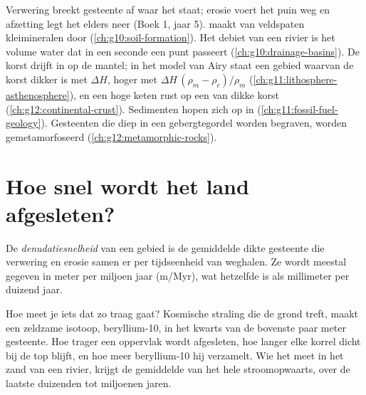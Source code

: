 \begin{recall}
Verwering breekt gesteente af waar het staat; erosie voert het puin weg
en afzetting legt het elders neer (Boek 1, jaar 5). 
maakt van veldspaten kleimineralen door 
(\cref{ch:g10:soil-formation}). Het debiet van een rivier is het volume
water dat in een seconde een punt passeert (\cref{ch:g10:drainage-basins}). De
korst drijft in  op de mantel; in het model van Airy staat een gebied waarvan de korst
dikker is met $\Delta H$, hoger met $\Delta H\,(\rho_m - \rho_c)/\rho_m$
(\cref{ch:g11:lithosphere-asthenosphere}), en een hoge keten rust op een 
van dikke korst (\cref{ch:g12:continental-crust}). Sedimenten hopen zich op in
 (\cref{ch:g11:fossil-fuel-geology}). Gesteenten die diep in
een gebergtegordel worden begraven, worden gemetamorfoseerd (\cref{ch:g12:metamorphic-rocks}).
\end{recall}

\section{Hoe snel wordt het land afgesleten?}

\begin{definition}[Denudatiesnelheid]\label{def:g12:destruction-of-mountains:denudation}
De \emph{denudatiesnelheid} van een gebied is de gemiddelde
dikte gesteente die verwering en erosie samen er per
tijdseenheid van weghalen. Ze wordt meestal gegeven in meter per miljoen jaar
(\unit{m/Myr}), wat hetzelfde is als millimeter per duizend jaar.
\end{definition}

Hoe meet je iets dat zo traag gaat? Kosmische straling die de grond treft, maakt
een zeldzame isotoop, beryllium-10, in het kwarts van de bovenste paar meter gesteente.
Hoe trager een oppervlak wordt afgesleten, hoe langer elke korrel dicht bij de top blijft,
en hoe meer beryllium-10 hij verzamelt. Wie het meet in het zand van een rivier,
krijgt de gemiddelde  van het hele  stroomopwaarts, over de laatste
duizenden tot miljoenen jaren.

